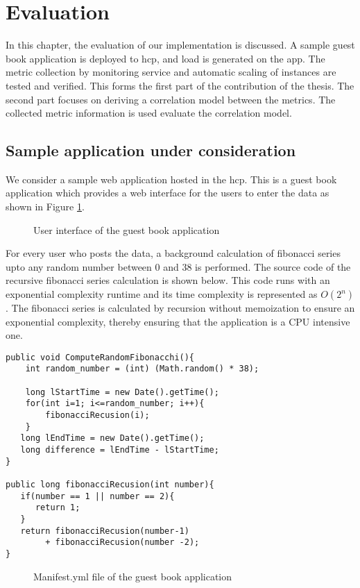 \documentclass[article,type=msc,colorback,12pt,accentcolor=tud8b,table]{tudthesis}
\begin{document}
 \cleardoublepage
 
  \hfill 
 \section{Evaluation}
 \hfill \break
 
 In this chapter, the evaluation of our implementation is discussed. A sample guest book application is deployed to \gls{hcp}, and load is generated on the app. The metric collection by monitoring service and automatic scaling of instances are tested and verified. This forms the first part of the contribution of the thesis. The second part focuses on deriving a correlation model between the metrics. The collected metric information is used evaluate the correlation model. 

	\subsection{Sample application under consideration}
We consider a sample web application hosted in the \gls{hcp}. This is a guest book application which provides a web interface for the users to enter the data as shown in Figure \ref{fig:guestbook_ui}. 
 \begin{figure}[h]
 \begin{center}
  \makebox[\textwidth]{\texttt{[image: E1]}}
\end{center}
\caption{User interface of the guest book application}
\label{fig:guestbook_ui}
\end{figure}
For every user who posts the data, a background calculation of fibonacci series upto any random number between 0 and 38 is performed. The source code of the recursive fibonacci series calculation is shown below. This code runs with an exponential complexity runtime and its time complexity is represented as $O(2^n)$. The fibonacci series is calculated by recursion without memoization to ensure an exponential complexity, thereby ensuring that the application is a CPU intensive one.
 \begin{lstlisting}
public void ComputeRandomFibonacchi(){		
	int random_number = (int) (Math.random() * 38);		
		
	long lStartTime = new Date().getTime();
	for(int i=1; i<=random_number; i++){
		fibonacciRecusion(i);
    }			
   long lEndTime = new Date().getTime();
   long difference = lEndTime - lStartTime;    	
}
		  
public long fibonacciRecusion(int number){
   if(number == 1 || number == 2){
      return 1;
   }
   return fibonacciRecusion(number-1) 
   		+ fibonacciRecusion(number -2); 
}
\end{lstlisting}
 \begin{figure}
 \begin{center}
  \makebox[\textwidth]{\texttt{[image: E2]}}
\end{center}
\caption{Manifest.yml file of the guest book application}
\label{fig:guestbook_manifest}
\end{figure}
\end{document}
